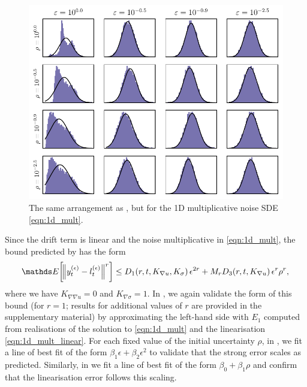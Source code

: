 \begin{figure}
	\begin{center}
		\includegraphics[width=\textwidth]{chp04_paper_numerics/figures/multiplicative/selected_hists.pdf}
		\caption{The same arrangement as , but for the 1D multiplicative noise SDE \cref{eqn:1d_mult}.}
		\label{fig:1d_mult_hists}
	\end{center}
\end{figure}

Since the drift term is linear and the noise multiplicative in \cref{eqn:1d_mult}, the bound predicted by  has the form
\[
	\avg{\norm{y_t^{(\epsilon)} - l_t^{(\epsilon)}}^r} \leq D_1\!\left(r,t, K_{\nabla u}, K_\sigma\right)\epsilon^{2r} + M_{r}D_3\!\left(r,t, K_{\nabla u}\right)\epsilon^r\rho^{r},
\]
where we have \(K_{\nabla\nabla u} = 0\) and \(K_{\nabla\sigma} = 1\).
In , we again validate the form of this bound (for \(r = 1\); results for additional values of \(r\) are provided in the supplementary material) by approximating the left-hand side with \(E_1\) computed from realisations of the solution to \cref{eqn:1d_mult} and the linearisation \cref{eqn:1d_mult_linear}.
For each fixed value of the initial uncertainty \(\rho\), in , we fit a line of best fit of the form \(\beta_1 \epsilon + \beta_2 \epsilon^2\) to validate that the strong error scales as predicted.
Similarly, in  we fit a line of best fit of the form \(\beta_0 + \beta_1 \rho\) and confirm that the linearisation error follows this scaling.

